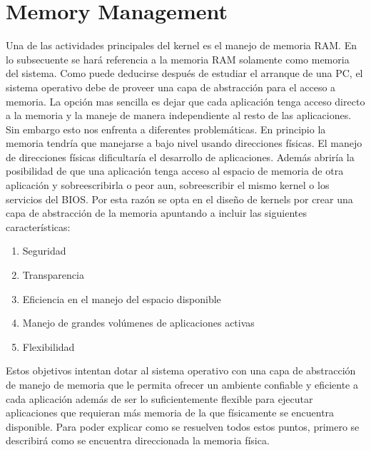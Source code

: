 \section{Memory Management} 
Una de las actividades principales del kernel es el manejo de memoria RAM. En
lo subsecuente se hará referencia a la memoria RAM solamente como memoria del
sistema. Como puede deducirse después de estudiar el arranque de una PC, el
sistema operativo debe de proveer una capa de abstracción para el acceso a
memoria. La opción mas sencilla es dejar que cada aplicación tenga acceso
directo a la memoria y la maneje de manera independiente al resto de las
aplicaciones. Sin embargo esto nos enfrenta a diferentes problemáticas. En
principio la memoria tendría que manejarse a bajo nivel usando direcciones
físicas. El manejo de direcciones físicas dificultaría el desarrollo de
aplicaciones. Además abriría la posibilidad de que una aplicación tenga acceso
al espacio de memoria de otra aplicación y sobreescribirla o peor aun,
sobreescribir el mismo kernel o los servicios del BIOS.  Por esta razón se opta
en el diseño de kernels por crear una capa de abstracción de la memoria
apuntando a incluir las siguientes características:
\begin{enumerate}
\item Seguridad
\item Transparencia
\item Eficiencia en el manejo del espacio disponible
\item Manejo de grandes volúmenes de aplicaciones activas
\item Flexibilidad
\end{enumerate} Estos objetivos intentan dotar al sistema operativo con una
capa de abstracción de manejo de memoria que le permita ofrecer un ambiente
confiable y eficiente a cada aplicación además de ser lo suficientemente
flexible para ejecutar aplicaciones que requieran más memoria de la que
físicamente se encuentra disponible. Para poder explicar como se resuelven
todos estos puntos, primero se describirá como se encuentra direccionada la
memoria física.

